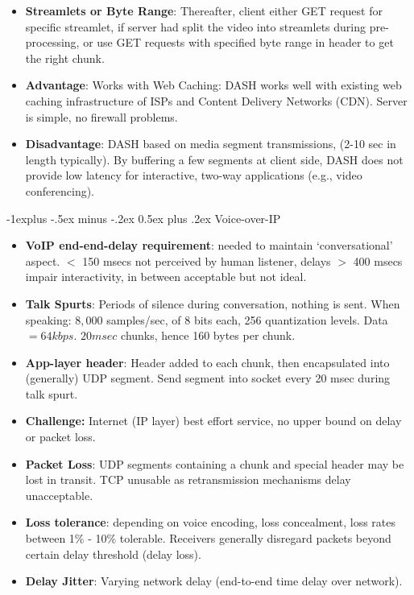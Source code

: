\documentclass[12pt, landscape]{article}
\makeatletter
\renewcommand{\subsection}{\@startsection{subsection}{2}{0.1mm}%
                                {-1explus -.5ex minus -.2ex}%
                                {0.5ex plus .2ex}%
                                {\normalfont\normalsize\bfseries}}
\makeatother
\begin{document}
\begin{multicols*}{3}
\begin{itemize}
\item \textbf{Streamlets or Byte Range}: Thereafter, client either GET request for specific streamlet, if 
server had split the video into streamlets during pre-processing, or use GET requests with specified byte range in header to get the right chunk.
\item \textbf{Advantage}: Works with Web Caching: DASH works well with existing web caching infrastructure of ISPs and Content Delivery Networks (CDN). Server is simple, no firewall problems.
\item \textbf{Disadvantage}:  DASH based on media segment transmissions, (2-10 sec in length typically). By buffering a few segments at client side, DASH does not provide low latency for interactive, two-way applications (e.g., video conferencing).
\end{itemize}



\subsection{Voice-over-IP}
\begin{itemize}
\item \textbf{VoIP end-end-delay requirement}: needed to maintain `conversational' aspect. $<$ 150 msecs not perceived by human listener, delays $>$ 400 msecs impair interactivity, in between acceptable but not ideal.
\item \textbf{Talk Spurts}: Periods of silence during conversation, nothing is sent. When speaking: $8,000$ samples/sec, of 8 bits each, 256 quantization levels. Data $= 64kbps$. $20 msec$ chunks, hence 160 bytes per chunk.
\item \textbf{App-layer header}: Header added to each chunk, then encapsulated into (generally) UDP segment. Send segment into socket every 20 msec during talk spurt.

\item \textbf{Challenge:} Internet (IP layer) best effort service, no upper bound on delay or packet loss.
\item \textbf{Packet Loss}: UDP segments containing a chunk and special header may be lost in transit. TCP unusable as retransmission mechanisms delay unacceptable. 
\item \textbf{Loss tolerance}: depending on voice encoding, loss concealment, loss rates between 1\% - 10\% tolerable. Receivers generally disregard packets beyond certain delay threshold (delay loss).
\item \textbf{Delay Jitter}: Varying network delay (end-to-end time delay over network). 
\end{itemize}


\end{multicols*}
\end{document}
